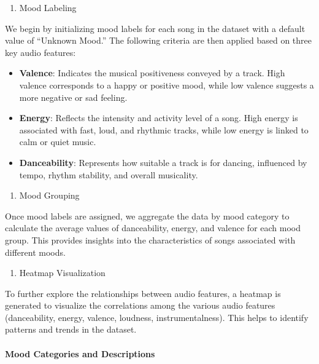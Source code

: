 \documentclass[
]{article}
\providecommand{\tightlist}{%
  \setlength{\itemsep}{0pt}\setlength{\parskip}{0pt}}
\begin{document}
\begin{enumerate}
\def\labelenumi{\arabic{enumi}.}
\tightlist
\item
  Mood Labeling
\end{enumerate}

We begin by initializing mood labels for each song in the dataset with a
default value of ``Unknown Mood.'' The following criteria are then
applied based on three key audio features:

\begin{itemize}
\tightlist
\item
  \textbf{Valence}: Indicates the musical positiveness conveyed by a
  track. High valence corresponds to a happy or positive mood, while low
  valence suggests a more negative or sad feeling.
\item
  \textbf{Energy}: Reflects the intensity and activity level of a song.
  High energy is associated with fast, loud, and rhythmic tracks, while
  low energy is linked to calm or quiet music.
\item
  \textbf{Danceability}: Represents how suitable a track is for dancing,
  influenced by tempo, rhythm stability, and overall musicality.
\end{itemize}

\begin{enumerate}
\def\labelenumi{\arabic{enumi}.}
\setcounter{enumi}{1}
\tightlist
\item
  Mood Grouping
\end{enumerate}

Once mood labels are assigned, we aggregate the data by mood category to
calculate the average values of danceability, energy, and valence for
each mood group. This provides insights into the characteristics of
songs associated with different moods.

\begin{enumerate}
\def\labelenumi{\arabic{enumi}.}
\setcounter{enumi}{2}
\tightlist
\item
  Heatmap Visualization
\end{enumerate}

To further explore the relationships between audio features, a heatmap
is generated to visualize the correlations among the various audio
features (danceability, energy, valence, loudness, instrumentalness).
This helps to identify patterns and trends in the dataset.

\paragraph{Mood Categories and
Descriptions}\label{mood-categories-and-descriptions}
\end{document}
